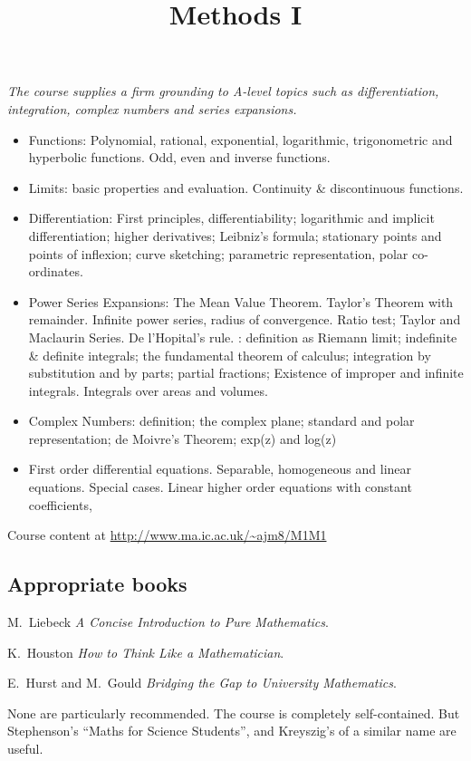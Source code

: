 \documentclass[twoside]{scrartcl}
\title{Methods I}
\begin{document}
{
{\Large\bfseries{}}

\textit{The course supplies a firm grounding to A-level topics such as differentiation, integration, complex numbers and series expansions.
}



\begin{itemize}
\item Functions: Polynomial, rational, exponential, logarithmic, trigonometric and hyperbolic functions. Odd, even and inverse functions.

\item Limits: basic properties and evaluation. Continuity \& discontinuous functions.

\item Differentiation: First principles, differentiability; logarithmic and implicit differentiation; higher derivatives; Leibniz's formula; stationary points and points of inflexion; curve sketching; parametric representation, polar co-ordinates.

\item Power Series Expansions: The Mean Value Theorem. Taylor's Theorem with remainder. Infinite power series, radius of convergence. Ratio test; Taylor and Maclaurin Series. De l'Hopital's rule.
\itemIntegration: definition as Riemann limit; indefinite & definite integrals; the fundamental theorem of calculus; integration by substitution and by parts; partial fractions; Existence of improper and infinite integrals. Integrals over areas and volumes.
\item Complex Numbers: definition; the complex plane; standard and polar representation; de Moivre's Theorem; exp(z) and log(z)

\item First order differential equations. Separable, homogeneous and linear equations. Special cases. Linear higher order equations with constant coefficients,
\end{itemize}

Course content at \url{http://www.ma.ic.ac.uk/~ajm8/M1M1}\\

\subsection*{Appropriate books}

{\shortskip
M.~Liebeck \emph{A Concise Introduction to Pure Mathematics}.

K.~Houston \emph{How to Think Like a Mathematician}. 

E.~Hurst and M.~Gould \emph{Bridging the Gap to University Mathematics}. 

None are particularly recommended. The course is completely self-contained. But Stephenson's ``Maths for Science Students'', and Kreyszig's of a similar name are useful. 

}}

\TableofContents

\end{document}

